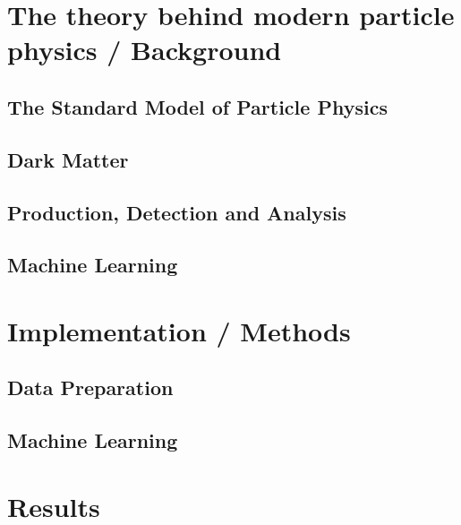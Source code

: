 \documentclass[12pt, a4paper]{book}
\begin{document}
\part{The theory behind modern particle physics / Background}
\chapter{The Standard Model of Particle Physics}\label{chap:SM}


\chapter{Dark Matter}\label{chap:DM}


\chapter{Production, Detection and Analysis}\label{chap:CERN_method}


\chapter{Machine Learning}



\part{Implementation / Methods}


\chapter{Data Preparation}\label{chap:data_prep}


\chapter{Machine Learning}\label{chap:ML}


\part{Results}


\end{document}
